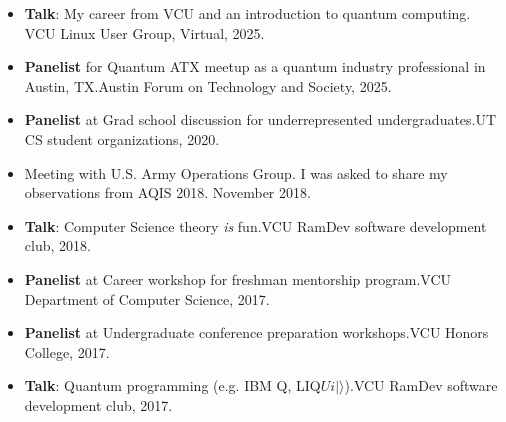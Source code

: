\documentclass[11pt,letterpaper,serif]{moderncv}
\begin{document}
\begin{itemize}
	\item[\textbullet] \textbf{Talk}: My career from VCU and an introduction to quantum computing. \quad VCU Linux User Group, Virtual, 2025.
	\item[\textbullet] \textbf{Panelist} for Quantum ATX meetup as a quantum industry professional in Austin, TX.\quad Austin Forum on Technology and Society, 2025.
	\item[\textbullet] \textbf{Panelist} at Grad school discussion for underrepresented undergraduates.\quad UT CS student organizations, 2020.
	\item[\textbullet] Meeting with U.S. Army Operations Group. I was asked to share my observations from AQIS 2018. November 2018.
	\item[\textbullet] \textbf{Talk}: Computer Science theory \emph{is} fun.\quad VCU RamDev software development club, 2018.
	\item[\textbullet] \textbf{Panelist} at Career workshop for freshman mentorship program.\quad VCU Department of Computer Science, 2017.
	\item[\textbullet] \textbf{Panelist} at Undergraduate conference preparation workshops.\quad VCU Honors College, 2017.
	\item[\textbullet] \textbf{Talk}: Quantum programming (e.g. IBM Q, LIQ$Ui|\rangle$).\quad VCU RamDev software development club, 2017.
\end{itemize}
\end{document}
